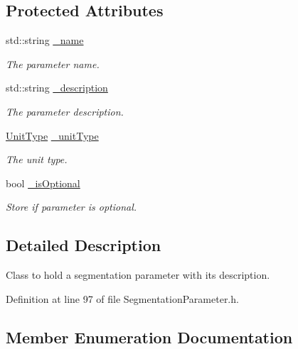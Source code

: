 \subsection*{Protected Attributes}
\begin{DoxyCompactItemize}
\item 
std\+::string \hyperlink{class_d_d4hep_1_1_d_d_segmentation_1_1_segmentation_parameter_a3d95d4b4814b3a5e1f15a432ca6526b1}{\+\_\+name}
\begin{DoxyCompactList}\small\item\em The parameter name. \end{DoxyCompactList}\item 
std\+::string \hyperlink{class_d_d4hep_1_1_d_d_segmentation_1_1_segmentation_parameter_a1b798aa8deadc4d66205109cbe6bc120}{\+\_\+description}
\begin{DoxyCompactList}\small\item\em The parameter description. \end{DoxyCompactList}\item 
\hyperlink{class_d_d4hep_1_1_d_d_segmentation_1_1_segmentation_parameter_a36f5f8b8d812b2a2b81363377565d8d4}{Unit\+Type} \hyperlink{class_d_d4hep_1_1_d_d_segmentation_1_1_segmentation_parameter_a1f5990f9669bf3265f6253f1f9a03e2a}{\+\_\+unit\+Type}
\begin{DoxyCompactList}\small\item\em The unit type. \end{DoxyCompactList}\item 
bool \hyperlink{class_d_d4hep_1_1_d_d_segmentation_1_1_segmentation_parameter_a0dfb17241c0a1ed7f6a54c13ec6c9adb}{\+\_\+is\+Optional}
\begin{DoxyCompactList}\small\item\em Store if parameter is optional. \end{DoxyCompactList}\end{DoxyCompactItemize}


\subsection{Detailed Description}
Class to hold a segmentation parameter with its description. 

Definition at line 97 of file Segmentation\+Parameter.\+h.



\subsection{Member Enumeration Documentation}
\hypertarget{class_d_d4hep_1_1_d_d_segmentation_1_1_segmentation_parameter_a36f5f8b8d812b2a2b81363377565d8d4}{}\label{class_d_d4hep_1_1_d_d_segmentation_1_1_segmentation_parameter_a36f5f8b8d812b2a2b81363377565d8d4} 
